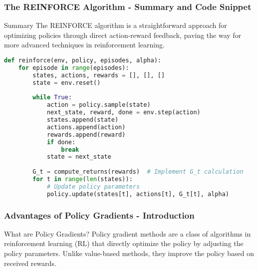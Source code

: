 \documentclass[aspectratio=169]{beamer}
\begin{document}
\begin{frame}[fragile]
    \frametitle{The REINFORCE Algorithm - Summary and Code Snippet}
    \begin{block}{Summary}
        The REINFORCE algorithm is a straightforward approach for optimizing policies through direct action-reward feedback, paving the way for more advanced techniques in reinforcement learning.
    \end{block}
    
    \begin{lstlisting}[language=Python]
def reinforce(env, policy, episodes, alpha):
    for episode in range(episodes):
        states, actions, rewards = [], [], []
        state = env.reset()
        
        while True:
            action = policy.sample(state)
            next_state, reward, done = env.step(action)
            states.append(state)
            actions.append(action)
            rewards.append(reward)
            if done:
                break
            state = next_state
            
        G_t = compute_returns(rewards)  # Implement G_t calculation
        for t in range(len(states)):
            # Update policy parameters
            policy.update(states[t], actions[t], G_t[t], alpha)
    \end{lstlisting}
\end{frame}

\begin{frame}[fragile]
    \frametitle{Advantages of Policy Gradients - Introduction}
    \begin{block}{What are Policy Gradients?}
        Policy gradient methods are a class of algorithms in reinforcement learning (RL) that directly optimize the policy by adjusting the policy parameters.
        Unlike value-based methods, they improve the policy based on received rewards.
    \end{block}
\end{frame}
\end{document}
